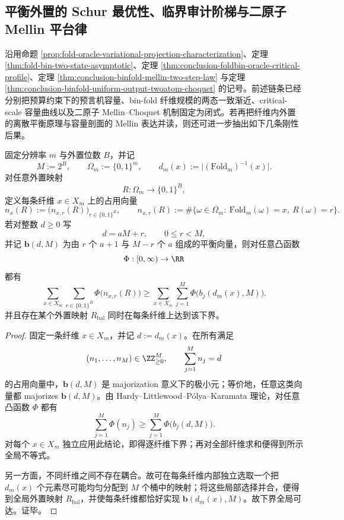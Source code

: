 \subsection{平衡外置的 Schur 最优性、临界审计阶梯与二原子 Mellin 平台律}\label{subsec:conclusion-balanced-externalization-harmonic-staircase-mellin-plateau}
沿用命题 \ref{prop:fold-oracle-variational-projection-characterization}、定理 \ref{thm:fold-bin-two-state-asymptotic}、定理 \ref{thm:conclusion-foldbin-oracle-critical-profile}、定理 \ref{thm:conclusion-binfold-mellin-two-step-law} 与定理 \ref{thm:conclusion-binfold-uniform-output-twoatom-choquet} 的记号。前述链条已经分别把预算约束下的预言机容量、bin-fold 纤维规模的两态一致渐近、critical-scale 容量曲线以及二原子 Mellin--Choquet 机制固定为闭式。若再把纤维内外置的离散平衡原理与容量剖面的 Mellin 表达并读，则还可进一步抽出如下几条刚性后果。

\begin{theorem}[纤维内平衡外置对全部凸审计泛函的普适最优性]\label{thm:conclusion-balanced-externalization-schur-optimality}
固定分辨率 \(m\) 与外置位数 \(B\)，并记
\[
M:=2^B,\qquad
\Omega_m:=\{0,1\}^m,
\qquad
d_m(x):=\bigl|(\mathrm{Fold}_m)^{-1}(x)\bigr|.
\]
对任意外置映射
\[
R:\Omega_m\to\{0,1\}^B,
\]
定义每条纤维 \(x\in X_m\) 上的占用向量
\[
n_x(R):=\bigl(n_{x,r}(R)\bigr)_{r\in\{0,1\}^B},
\qquad
n_{x,r}(R):=\#\{\omega\in\Omega_m:\ \mathrm{Fold}_m(\omega)=x,\ R(\omega)=r\}.
\]
若对整数 \(d\ge 0\) 写
\[
d=aM+r,\qquad 0\le r<M,
\]
并记 \(\mathbf b(d,M)\) 为由 \(r\) 个 \(a+1\) 与 \(M-r\) 个 \(a\) 组成的平衡向量，则对任意凸函数
\[
\Phi:[0,\infty)\to\RR
\]
都有
\[
\sum_{x\in X_m}\sum_{r\in\{0,1\}^B}\Phi\!\bigl(n_{x,r}(R)\bigr)
\ge
\sum_{x\in X_m}\sum_{j=1}^{M}\Phi\!\bigl(b_j(d_m(x),M)\bigr).
\]
并且存在某个外置映射 \(R_{\mathrm{bal}}\) 同时在每条纤维上达到该下界。
\end{theorem}
\begin{proof}
固定一条纤维 \(x\in X_m\)，并记 \(d:=d_m(x)\)。在所有满足
\[
(n_1,\dots,n_M)\in \ZZ_{\ge 0}^M,
\qquad
\sum_{j=1}^{M}n_j=d
\]
的占用向量中，\(\mathbf b(d,M)\) 是 majorization 意义下的极小元；等价地，任意这类向量都 majorizes \(\mathbf b(d,M)\)。由 Hardy--Littlewood--P\'olya--Karamata 理论，对任意凸函数 \(\Phi\) 都有
\[
\sum_{j=1}^{M}\Phi(n_j)\ge \sum_{j=1}^{M}\Phi\!\bigl(b_j(d,M)\bigr).
\]
对每个 \(x\in X_m\) 独立应用此结论，即得逐纤维下界；再对全部纤维求和便得到所示全局不等式。

另一方面，不同纤维之间不存在耦合。故可在每条纤维内部独立选取一个把 \(d_m(x)\) 个元素尽可能均匀分配到 \(M\) 个桶中的映射；将这些局部选择并合，便得到全局外置映射 \(R_{\mathrm{bal}}\)，并使每条纤维都恰好实现 \(\mathbf b(d_m(x),M)\)。故下界全局可达。证毕。
\end{proof}

